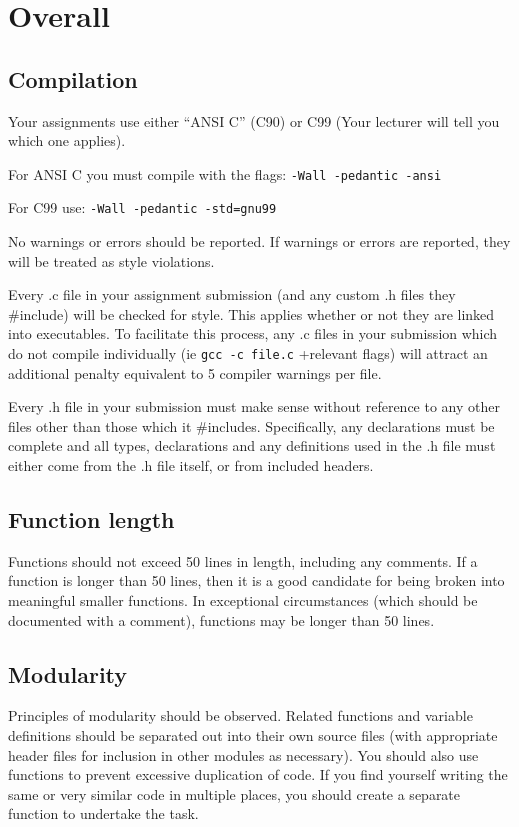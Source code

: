 \documentclass{article}
\begin{document}
\section{Overall}
\subsection{Compilation}
Your assignments use either ``ANSI C'' (C90) or C99 (Your lecturer will tell you which one applies).

For ANSI C you must compile with the flags: \texttt{-Wall -pedantic -ansi}

For C99 use: \texttt{-Wall -pedantic -std=gnu99}

No warnings or errors should be reported.
If warnings or errors are reported, they will be treated as style violations.

Every .c file in your assignment submission (and any custom .h files they \#include) will be checked for style.
This applies whether or not they are linked into executables.
To facilitate this process, any .c files in your submission which do not compile individually (ie \texttt{gcc -c file.c} +relevant flags) will attract an additional penalty equivalent to 5 compiler warnings per file.

Every .h file in your submission must make sense without reference to any other files other than those which it \#includes.
Specifically, any declarations must be complete and all types, declarations and any definitions used in the .h file must either come from the .h file itself, or from included headers.

\subsection{Function length}
Functions should not exceed 50 lines in length, including any comments.
If a function is longer than 50 lines, then it is a good candidate for being broken into meaningful smaller functions.
In exceptional circumstances (which should be documented with a comment), functions may be longer than 50 lines.

\subsection{Modularity}
Principles of modularity should be observed.
Related functions and variable definitions should be separated out into their own source files (with appropriate header files for inclusion in other modules as necessary).
You should also use functions to prevent excessive duplication of code.
If you find yourself writing the same or very similar code in multiple places, you should create a separate function to undertake the task.
\end{document}
